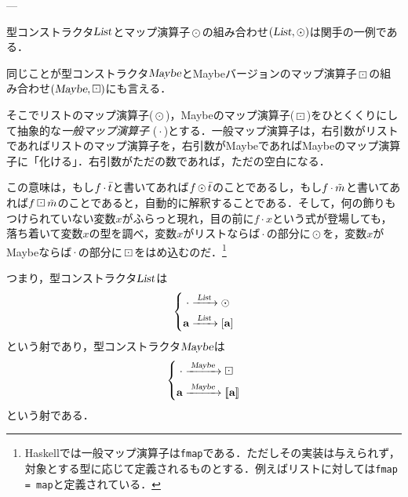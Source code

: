 \documentclass[twocolumn]{jsbook}
\def\[{\left[\!\left[}
\def\]{\right]\!\right]}
\newcommand{\programminglanguage}[1]{\textsf{#1}}
\newcommand{\haskell}{\programminglanguage{Haskell}}
\newcommand{\code}[1]{\texttt{#1}}
\newcommand{\keyword}[1]{{\emph{#1}}}
\newcommand{\hsklType}[1]{\textbf{#1}}
\newcommand{\hsklTypeConstructor}[1]{\textsl{#1}}
\DeclareMathOperator{\hsklFmap}{\cdot}
\DeclareMathOperator{\hsklListConstructor}{\hsklTypeConstructor{List}}
\DeclareMathOperator{\hsklMap}{\odot}
\DeclareMathOperator{\hsklMaybeConstructor}{\hsklTypeConstructor{Maybe}}
\DeclareMathOperator{\hsklMaybeMap}{\boxdot}
\newcommand{\hsklInt}{\hsklType{Int}}
\newcommand{\hsklListType}[1]{[#1]}
\newcommand{\hsklMaybeType}[1]{\[#1\]}
\newcommand{\hsklList}[1]{\Bar{#1}}
\newcommand{\hsklMaybe}[1]{\Tilde{#1}}
\newcommand{\mathSet}[1]{\mathbf{#1}} %
\newcommand{\mathCategoryShort}[2]{(#1,#2)}
\begin{document}

---

型コンストラクタ$\hsklListConstructor$とマップ演算子$\hsklMap$の組み合わせ$(\hsklListConstructor,\hsklMap)$は関手の一例である．

同じことが型コンストラクタ$\hsklMaybeConstructor$とMaybeバージョンのマップ演算子$\hsklMaybeMap$の組み合わせ$(\hsklMaybeConstructor,\hsklMaybeMap)$にも言える．

そこでリストのマップ演算子($\hsklMap$)，Maybeのマップ演算子($\hsklMaybeMap$)をひとくくりにして抽象的な\keyword{一般マップ演算子} ($\hsklFmap$)とする．一般マップ演算子は，右引数がリストであればリストのマップ演算子を，右引数がMaybeであればMaybeのマップ演算子に「化ける」．右引数がただの数であれば，ただの空白になる．

この意味は，もし$f\hsklFmap\hsklList{t}$と書いてあれば$f\hsklMap\hsklList{t}$のことであるし，もし$f\hsklFmap\hsklMaybe{m}$と書いてあれば$f\hsklMaybeMap\hsklMaybe{m}$のことであると，自動的に解釈することである．そして，何の飾りもつけられていない変数$x$がふらっと現れ，目の前に$f\hsklFmap x$という式が登場しても，落ち着いて変数$x$の型を調べ，変数$x$がリストならば$\hsklFmap$の部分に$\hsklMap$を，変数$x$がMaybeならば$\hsklFmap$の部分に$\hsklMaybeMap$をはめ込むのだ．\footnote{\haskell では一般マップ演算子は\code{fmap}である．ただしその実装は与えられず，対象とする型に応じて定義されるものとする．例えばリストに対しては\code{fmap = map}と定義されている．}

つまり，型コンストラクタ$\hsklListConstructor$は
\begin{equation*}
\left\{
\begin{split}
\hsklFmap&\xrightarrow{\;\hsklListConstructor\;}\hsklMap\\
\hsklType{a}&\xrightarrow{\;\hsklListConstructor\;}\hsklListType{\hsklType{a}}
\end{split}
\right.
\end{equation*}
という射であり，型コンストラクタ$\hsklMaybeConstructor$は
\begin{equation*}
\left\{
\begin{split}
\hsklFmap&\xrightarrow{\;\hsklMaybeConstructor\;}\hsklMaybeMap\\
\hsklType{a}&\xrightarrow{\;\hsklMaybeConstructor\;}\hsklMaybeType{\hsklType{a}}
\end{split}
\right.
\end{equation*}
という射である．
\end{document}
